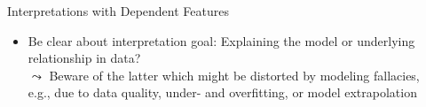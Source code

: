 \documentclass[11pt,compress,t,notes=noshow, aspectratio=169, xcolor=table]{beamer}
\begin{document}
\begin{frame}{Interpretations with Dependent Features}
\begin{itemize}



\pause

\item Be clear about interpretation goal: Explaining the model or underlying relationship in data?
\\
$\leadsto$ Beware of the latter which might be distorted by modeling fallacies, \\
e.g., due to data quality, under- and overfitting, or model extrapolation

\end{itemize}
\end{frame}
\end{document}
